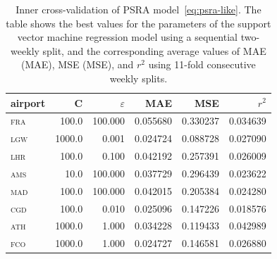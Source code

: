 \documentclass[draft,review]{elsarticle}
\newcommand{\airp}[1]{\textcolor{#1}{\textsc{#1}}}
\begin{document}
\begin{table}
  \caption{Inner cross-validation of \acs{PSRA} model~\eqref{eq:psra-like}. The table shows the best values for the parameters of the support vector machine regression model using a sequential two-weekly split, and the corresponding average values of \acl{MAE} (\acs{MAE}), \acl{MSE} (\acs{MSE}), and \(r^2\) using 11-fold consecutive weekly splits.}\label{tab:inner_cv}
  \centering
  \begin{tabular}{lrrrrr}
    \toprule
    airport &       C &    \(\varepsilon\) &       \acs{MAE} &       \acs{MSE} &        \(r^2\) \\
    \midrule
    \airp{fra} &   100.0 &  100.000 &  0.055680 &  0.330237 &  0.034639 \\
    \airp{lgw} &  1000.0 &    0.001 &  0.024724 &  0.088728 &  0.027090 \\
    \airp{lhr} &   100.0 &    0.100 &  0.042192 &  0.257391 &  0.026009 \\
    \airp{ams} &    10.0 &  100.000 &  0.037729 &  0.296439 &  0.023622 \\
    \airp{mad} &   100.0 &  100.000 &  0.042015 &  0.205384 &  0.024280 \\
    \airp{cgd} &   100.0 &    0.010 &  0.025096 &  0.147226 &  0.018576 \\
    \airp{ath} &  1000.0 &    1.000 &  0.034228 &  0.119433 &  0.042989 \\
    \airp{fco} &  1000.0 &    1.000 &  0.024727 &  0.146581 &  0.026880 \\
    \bottomrule
  \end{tabular}
\end{table}
\end{document}
